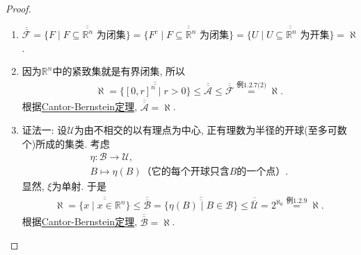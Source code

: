 \documentclass[../../main.tex]{subfiles}%
\begin{document}
\begin{proof}
\begin{enumerate}[(1)]
{\color{blue}证法三:}
设$\Gamma_k$为b边长为$\frac{1}{2^k}$的半开半闭正方体($k=0,1,2,\cdots$)的全体. 考虑
\begin{align*}
\theta: \mathscr{T}_{\rho_0^n} \to \bigcup_{k=0}^\infty \Gamma_k,
\end{align*}
$U \mapsto \theta(U)$为含于$U$中各$\Gamma_k(k=0,1,2,\cdots)$的半开半闭方体之集类, 它为单射. 于是
\begin{align*}
\aleph \stackrel{\text{\refthe{theorem:无穷多个集列的并的势}}}{=} \overline{\overline{\bigcup_{k=0}^\infty \Gamma_k}} \geqslant \overline{\overline{\mathscr{T}_{\rho_0^n}}} \geqslant \overline{\overline{\{B(\mathbf{0}; r)\mid r \in \mathbb{R}^+\}}} = \aleph.
\end{align*}
根据\hyperref[Set-Theory-theorem:Cantor-Bernstein定理]{Cantor-Bernstein定理}, $\overline{\overline{\mathscr{T}_{\rho_0^n}}} = \aleph$.

\item $\overline{\overline{\mathscr{F}}}=\overline{\overline{\{F\mid F\subseteq \mathbb{R}^n\text{ 为闭集}\}}}=\overline{\overline{\{F^c\mid F\subseteq \mathbb{R}^n\text{ 为闭集}\}}}=\overline{\overline{\{U\mid U\subseteq \mathbb{R}^n\text{ 为开集}\}}}=\aleph$.

\item 因为$\mathbb{R}^n$中的紧致集就是有界闭集, 所以
\begin{align*}
\aleph = \overline{\overline{\{[0,r]^n\mid r > 0\}}} \leqslant \overline{\overline{\mathscr{A}}} \leqslant \overline{\overline{\mathscr{F}}} \stackrel{\text{例1.2.7(2)}}{=} \aleph.
\end{align*}
根据\hyperref[Set-Theory-theorem:Cantor-Bernstein定理]{Cantor-Bernstein定理}, $\overline{\overline{\mathscr{A}}}=\aleph$.

\item {\color{blue}证法一:}
设$\mathscr{U}$为由不相交的以有理点为中心, 正有理数为半径的开球(至多可数个)所成的集类. 考虑
\begin{gather*}
\eta: \mathscr{B} \to \mathscr{U}, \\
B \mapsto \eta(B)\text{（它的每个开球只含}B\text{的一个点）}.
\end{gather*}
显然, $\xi$为单射. 于是
\begin{align*}
\aleph = \overline{\overline{\{x\mid x \in \mathbb{R}^n\}}} \leqslant \overline{\overline{\mathscr{B}}} = \overline{\overline{\{\eta(B)\mid B \in \mathscr{B}\}}} \leqslant \overline{\overline{\mathscr{U}}} = 2^{\aleph_0} \stackrel{\text{例1.2.9}}{=} \aleph.
\end{align*}
根据\hyperref[Set-Theory-theorem:Cantor-Bernstein定理]{Cantor-Bernstein定理}, $\overline{\overline{\mathscr{B}}}=\aleph$.


\end{enumerate}
\end{proof}
\end{document}
